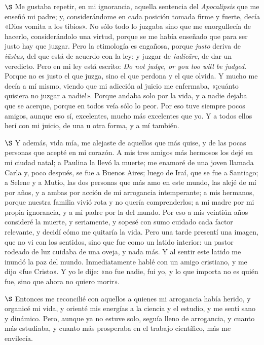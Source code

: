 \documentclass[a4paper, 12pt]{article}
\begin{document}
$\S$ Me gustaba repetir, en mi ignorancia, aquella sentencia del
\textit{Apocalipsis} que me enseñó mi padre; y, considerándome en cada posición
tomada firme y fuerte, decía «Dios vomita a los tibios». No sólo todo lo juzgaba
sino que me enorgullecía de hacerlo, considerándolo una virtud, porque se me
había enseñado que para ser justo hay que juzgar. Pero la etimología es
engañosa, porque \textit{justo} deriva de \textit{iūstus}, del que está de
acuerdo con la ley; y juzgar de \textit{iudicāre}, de dar un veredicto. Pero en
mi ley está escrito: \textit{Do not judge, or you too will be judged}. Porque no
es justo el que juzga, sino el que perdona y el que olvida. Y mucho me decía a
mí mismo, viendo que mi adicción al juicio me enfermaba, «¡cuánto quisiera no
juzgar a nadie!». Porque andaba solo por la vida, y a nadie dejaba que se
acerque, porque en todos veía sólo lo peor. Por eso tuve siempre pocos amigos,
aunque eso sí, excelentes, mucho más excelentes que yo. Y a todos ellos herí con
mi juicio, de una u otra forma, y a mí también.


$\S$ Y además, vida mía, me alejaste de aquellos que más quise, y de las pocas
personas que acepté en mi corazón. A mis tres amigos más hermosos los dejé en mi
ciudad natal; a Paulina la llevó la muerte; me enamoré de una joven llamada
Carla y, poco después, se fue a Buenos Aires; luego de Iraí, que se fue a
Santiago; a Selene y a Mutio, las dos personas que más amo en este mundo, las
alejé de mí por años, y a ambas por acción de mi arrogancia intemperante; a mis
hermanos, porque nuestra familia vivió rota y no quería comprenderlos; a mi
madre por mi propia ignorancia, y a mi padre por la del mundo. Por eso a mis
veintiún años consideré la muerte, y seriamente, y sopesé con sumo cuidado cada
factor relevante, y decidí cómo me quitaría la vida. Pero una tarde presentí una
imagen, que no vi con los sentidos, sino que fue como un latido interior: un
pastor rodeado de luz cuidaba de una oveja, y nada más. Y al sentir este latido
me inundó la paz del mundo. Inmediatamente hablé con un amigo cristiano, y me
dijo «fue Cristo». Y yo le dije: «no fue nadie, fui yo, y lo que importa no es
quién fue, sino que ahora no quiero morir». 

$\S$ Entonces me reconcilié con aquellos a quienes mi arrogancia había herido, y
organicé mi vida, y orienté mis energías a la ciencia y el estudio, y me sentí
sano y dinámico. Pero, aunque ya no estuve solo, seguía lleno de arrogancia, y
cuanto más estudiaba, y cuanto más prosperaba en el trabajo científico, más me
envilecía.
\end{document}
